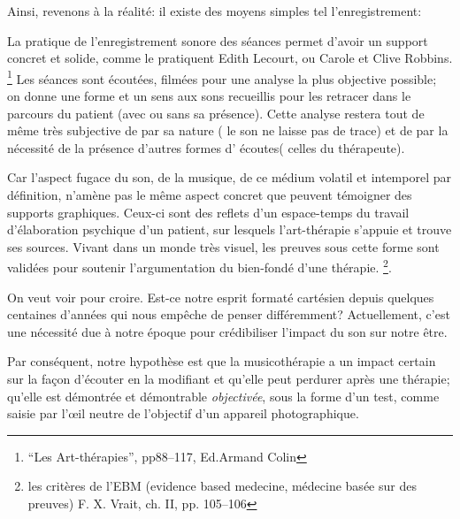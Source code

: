  Ainsi, revenons à la réalité: il existe des moyens simples tel l'enregistrement:
 
 La pratique de l'enregistrement sonore des séances 
permet d'avoir un support concret et solide, comme le pratiquent Edith Lecourt, ou Carole et Clive 
Robbins. \footnote{``Les Art-thérapies'', pp88--117, Ed.Armand Colin}
Les séances sont écoutées, filmées pour une
analyse la plus objective possible; on donne 
une forme et un sens aux sons recueillis pour les retracer dans le
parcours du patient (avec ou sans sa présence). Cette analyse  restera
tout de même très subjective de par sa nature ( le son ne laisse pas
de trace) et de par la nécessité de la présence d'autres formes d' écoutes(
celles du thérapeute).


Car l'aspect fugace du son, de la musique, de ce médium volatil et
intemporel par
définition, n'amène pas le
même aspect concret que peuvent témoigner des supports
graphiques. Ceux-ci sont des 
reflets d'un espace-temps du travail d'élaboration
psychique d'un patient, sur lesquels l'art-thérapie s'appuie et trouve
ses sources. 
Vivant dans un monde très visuel, les preuves sous cette forme sont
validées pour soutenir l'argumentation du bien-fondé d'une thérapie. \footnote{
	les critères de l'EBM (evidence based medecine, médecine basée sur des 
        preuves) F. X. Vrait, ch. II, pp. 105--106 }.

     On veut voir pour croire. Est-ce 
notre esprit formaté cartésien depuis quelques centaines d'années qui nous 
empêche de penser différemment? 
Actuellement, c'est une nécessité due à notre époque pour crédibiliser l'impact 
du son sur notre être. 

Par conséquent, notre hypothèse est que  la 
musicothérapie a un impact certain sur la façon d'écouter en la
modifiant et qu'elle peut perdurer après une thérapie; qu'elle est 
démontrée et démontrable \textsl{objectivée}, sous la forme d'un test, comme saisie par 
l'\oe il neutre de l'objectif d'un appareil
photographique.


